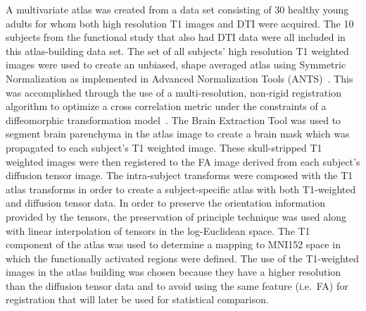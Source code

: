 A multivariate atlas was created from a data set consisting of 30 healthy young adults for whom both high resolution T1 images and DTI were acquired. The 10 subjects from the functional study that also had DTI data were all included in this atlas-building data set. The set of all subjects' high resolution T1 weighted images were used to create an unbiased, shape averaged atlas using Symmetric Normalization as implemented in Advanced Normalization Tools (ANTS)~\cite{ANTS}. This was accomplished through the use of a multi-resolution, non-rigid registration algorithm to optimize a cross correlation metric under the constraints of a diffeomorphic transformation model~\cite{Avants2006}. The Brain Extraction Tool \cite{Smith2002} was used to segment brain parenchyma in the atlas image to create a brain mask which was propagated to each subject's T1 weighted image.  These skull-stripped T1 weighted images were then registered to the FA image derived from each subject's diffusion tensor image. The intra-subject transforms were composed with the T1 atlas transforms in order to create a subject-specific atlas with both T1-weighted and diffusion tensor data. In order to preserve the orientation information provided by the tensors, the preservation of principle technique was used along with linear interpolation of tensors in the log-Euclidean space. The T1 component of the atlas was used to determine a mapping to MNI152 space in which the functionally activated regions were defined. The use of the T1-weighted images in the atlas building was chosen because they have a higher resolution than the diffusion tensor data and to avoid using the same feature (i.e.\ FA) for registration that will later be used for statistical comparison.

